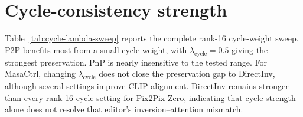 \documentclass{article} %
\begin{document}
\section{Cycle-consistency strength}
\label{sec:cycle-lambda-sweep}
Table~\ref{tab:cycle-lambda-sweep} reports the complete rank-16 cycle-weight sweep. P2P benefits most from a small cycle weight, with $\lambda_{\mathrm{cycle}}=0.5$ giving the strongest preservation. PnP is nearly insensitive to the tested range. For MasaCtrl, changing $\lambda_{\mathrm{cycle}}$ does not close the preservation gap to DirectInv, although several settings improve CLIP alignment. DirectInv remains stronger than every rank-16 cycle setting for Pix2Pix-Zero, indicating that cycle strength alone does not resolve that editor's inversion--attention mismatch.

\begin{table}[p]
  \centering
  \scriptsize
  \setlength{\tabcolsep}{2.2pt}
  \renewcommand{\arraystretch}{0.90}
  \caption{Complete cycle-loss sweep for rank-16 LoRA+DirectInv on PIE-Bench. Bold denotes the best result within each editor, including the reproduced SD1.5 DirectInv control. Italics denote the best cycle-loss setting for each metric.}
  \label{tab:cycle-lambda-sweep}
\end{table}
\end{document}
